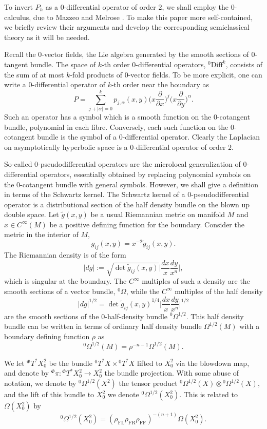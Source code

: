 \documentclass[10pt, a4paper, twoside]{amsart}
\numberwithin{equation}{section}
\theoremstyle{remark}
\begin{document}
To invert $P_h$ as a $0$-differential operator of order $2$, we shall employ the $0$-calculus, due to Mazzeo and Melrose \cite{Mazzeo-Melrose}. To make this paper more  self-contained, we briefly review their arguments and develop the corresponding semiclassical theory as it will be needed.

Recall the $0$-vector fields, the Lie algebra generated by the smooth sections of $0$-tangent bundle. The space of $k$-th order $0$-differential operators, ${}^0 \text{Diff}^k$, consists of the sum of at most $k$-fold products of $0$-vector fields. To be more explicit, one can write a $0$-differential operator of $k$-th order near the boundary as $$P = \sum_{j + |\alpha| = 0}^k p_{j, \alpha}(x, y) \bigg(x \frac{\partial}{\partial x}\bigg)^j \bigg(x\frac{\partial}{\partial y}\bigg)^\alpha.$$ 
Such an operator has a symbol which is a smooth function on the $0$-cotangent bundle, polynomial in each fibre. Conversely, each such function on the $0$-cotangent bundle is the symbol of a $0$-differential operator. 
 Clearly the Laplacian on asymptotically hyperbolic space is a $0$-differential operator of order $2$. 

So-called $0$-pseudodifferential operators are the microlocal generalization of $0$-differential operators, essentially obtained by replacing polynomial symbols on the $0$-cotangent bundle with general symbols. However, we shall give a definition in terms of the Schwartz kernel. The Schwartz kernel of a $0$-pseudodifferential operator is a distributional section of the half density bundle on the blown up double space. Let $\tilde g(x, y)$ be a usual Riemannian metric on manifold $M$ and $x \in C^\infty(M)$ be a positive defining function for the boundary. Consider the metric in the interior of $M$, 
$$
g_{ij}(x, y) = x^{-2}\tilde g_{ij}(x, y).
$$ 
The Riemannian density is of the form 
$$
|dg| := \sqrt{\det \tilde g_{ij}(x, y)} \Big| \frac{dx}{x}\frac{dy}{x^n} \Big|,
$$ 
which is singular at the boundary. The $C^\infty$ multiples of such a density are the smooth sections of a vector bundle, ${}^0 \Omega$, while the $C^\infty$ multiples of the half density
$$
|dg|^{1/2} = {\det \tilde g_{ij}(x, y)}^{1/4}\bigg|\frac{dx}{x}\frac{dy}{x^n}\bigg|^{1/2}
$$ 
are the smooth sections of the $0$-half-density bundle ${}^0 \Omega^{1/2}$. This half density bundle can be written in terms of ordinary half density bundle $\Omega^{1/2}(M)$ with a boundary defining function $\rho$ as $${}^0 \Omega^{1/2}(M) = \rho^{- n -1}\Omega^{1/2}(M).$$ 

We let ${}^\Phi T^* X^2_0$ be the bundle ${}^0 T^* X \times {}^0 T^* X$ lifted to $X^2_0$ via the blowdown map, and denote by ${}^\Phi \pi : {}^\Phi T^* X^2_0 \to X^2_0$ the bundle projection. 
With some abuse of notation, we denote by ${{}^0\Omega^{1/2}}(X^2)$ the tensor product ${{}^0\Omega^{1/2}}(X) \otimes {{}^0\Omega^{1/2}}(X)$, and the lift of this bundle to $X^2_0$ we denote ${{}^0\Omega^{1/2}}(X^2_0)$. This is related to $\Omega(X^2_0)$ by 
\begin{equation}
{{}^0\Omega^{1/2}}(X^2_0) = (\rho_{\mathrm{FL}}\rho_{\mathrm{FR}}\rho_{\mathrm{FF}})^{-(n+1)} \Omega(X^2_0). 
\label{Omega}\end{equation}
\end{document}
